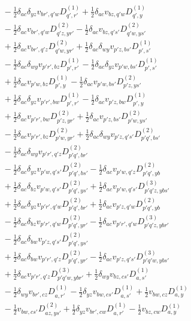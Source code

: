 \begin{align*}
&\quad -\tfrac12\delta_{ac}\delta_{yz}v_{br',q'w}D^{(1)}_{q',r'}+\tfrac12\delta_{ac}v_{bz,q'w}D^{(1)}_{q',y} \\
&\quad -\tfrac12\delta_{ac}v_{br',q'w}D^{(2)}_{q'z,yr'}-\tfrac12\delta_{ac}v_{bz,q's'}D^{(2)}_{q'w,ys'} \\
&\quad +\tfrac12\delta_{ac}v_{br',q'z}D^{(2)}_{q'w,yr'}+\tfrac12\delta_{ac}\delta_{wy}v_{p'z,bs'}D^{(1)}_{p',s'} \\
&\quad -\tfrac12\delta_{ac}\delta_{wy}v_{p'r',bz}D^{(1)}_{p',r'}-\tfrac12\delta_{ac}\delta_{yz}v_{p'w,bs'}D^{(1)}_{p',s'} \\
&\quad +\tfrac12\delta_{ac}v_{p'w,bz}D^{(1)}_{p',y}-\tfrac12\delta_{ac}v_{p'w,bs'}D^{(2)}_{p'z,ys'} \\
&\quad +\tfrac12\delta_{ac}\delta_{yz}v_{p'r',bw}D^{(1)}_{p',r'}-\tfrac12\delta_{ac}v_{p'z,bw}D^{(1)}_{p',y} \\
&\quad +\tfrac12\delta_{ac}v_{p'r',bw}D^{(2)}_{p'z,yr'}+\tfrac12\delta_{ac}v_{p'z,bs'}D^{(2)}_{p'w,ys'} \\
&\quad -\tfrac12\delta_{ac}v_{p'r',bz}D^{(2)}_{p'w,yr'}+\tfrac12\delta_{ac}\delta_{wy}v_{p'z,q's'}D^{(2)}_{p'q',bs'} \\
&\quad -\tfrac12\delta_{ac}\delta_{wy}v_{p'r',q'z}D^{(2)}_{p'q',br'} \\
&\quad -\tfrac12\delta_{ac}\delta_{yz}v_{p'w,q's'}D^{(2)}_{p'q',bs'}-\tfrac12\delta_{ac}v_{p'w,q'z}D^{(2)}_{p'q',yb} \\
&\quad +\tfrac12\delta_{ac}\delta_{bz}v_{p'w,q's'}D^{(2)}_{p'q',ys'}+\tfrac12\delta_{ac}v_{p'w,q's'}D^{(3)}_{p'q'z,ybs'} \\
&\quad +\tfrac12\delta_{ac}\delta_{yz}v_{p'r',q'w}D^{(2)}_{p'q',br'}+\tfrac12\delta_{ac}v_{p'z,q'w}D^{(2)}_{p'q',yb} \\
&\quad -\tfrac12\delta_{ac}\delta_{bz}v_{p'r',q'w}D^{(2)}_{p'q',yr'}-\tfrac12\delta_{ac}v_{p'r',q'w}D^{(3)}_{p'q'z,ybr'} \\
&\quad -\tfrac12\delta_{ac}\delta_{bw}v_{p'z,q's'}D^{(2)}_{p'q',ys'} \\
&\quad +\tfrac12\delta_{ac}\delta_{bw}v_{p'r',q'z}D^{(2)}_{p'q',yr'}-\tfrac12\delta_{ac}v_{p'z,q's'}D^{(3)}_{p'q'w,ybs'} \\
&\quad +\tfrac12\delta_{ac}v_{p'r',q'z}D^{(3)}_{p'q'w,ybr'}+\tfrac12\delta_{wy}v_{bz,cs'}D^{(1)}_{a,s'} \\
&\quad -\tfrac12\delta_{wy}v_{br',cz}D^{(1)}_{a,r'}-\tfrac12\delta_{yz}v_{bw,cs'}D^{(1)}_{a,s'}+\tfrac12v_{bw,cz}D^{(1)}_{a,y} \\
&\quad -\tfrac12v_{bw,cs'}D^{(2)}_{az,ys'}+\tfrac12\delta_{yz}v_{br',cw}D^{(1)}_{a,r'}-\tfrac12v_{bz,cw}D^{(1)}_{a,y} \\

\end{align*}
